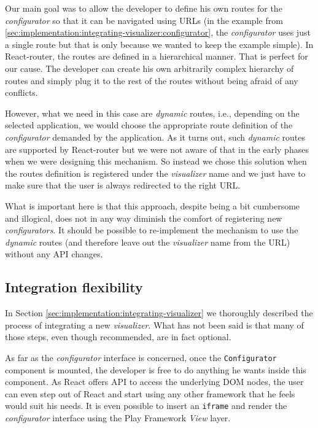 Our main goal was to allow the developer to define his own routes for the \emph{configurator} so that it can be navigated using URLs  (in the example from \ref{sec:implementation:integrating-visualizer:configurator}, the \emph{configurator} uses just a single route but that is only because we wanted to keep the example simple). In  React-router, the routes are defined in a hierarchical manner. That is perfect for our cause. The developer can create his own arbitrarily complex hierarchy of routes and simply plug it to the rest of the routes without being afraid of any conflicts.

However, what we need in this case are \emph{dynamic} routes, i.e., depending on the selected application, we would choose the appropriate route definition of the \emph{configurator} demanded by the application. As it turns out, such \emph{dynamic} routes are supported by React-router but we were not aware of that in the early phases when we were designing this mechanism. So instead we chose this solution when the routes definition is registered under the \emph{visualizer} name and we just have to make sure that the user is always redirected to the right URL.

What is important here is that this approach, despite being a bit cumbersome and illogical, does not in any way diminish the comfort of registering new \emph{configurators}. It should be possible to re-implement the mechanism to use the \emph{dynamic} routes (and therefore leave out the \emph{visualizer} name from the URL) without any API changes.

\subsection{Integration flexibility}

In Section \ref{sec:implementation:integrating-visualizer} we thoroughly described the process of integrating a new \emph{visualizer}. What has not been said is that many of those steps, even though recommended, are in fact optional.

As far as the \emph{configurator} interface is concerned, once the \texttt{Configurator} component is mounted, the developer is free to do anything he wants inside this component. As React offers API to access the underlying DOM nodes, the user can even step out of React and start using any other framework that he feels would suit his needs. It is even possible to insert an \texttt{iframe} and render the \emph{configurator} interface using the Play Framework \emph{View} layer.

